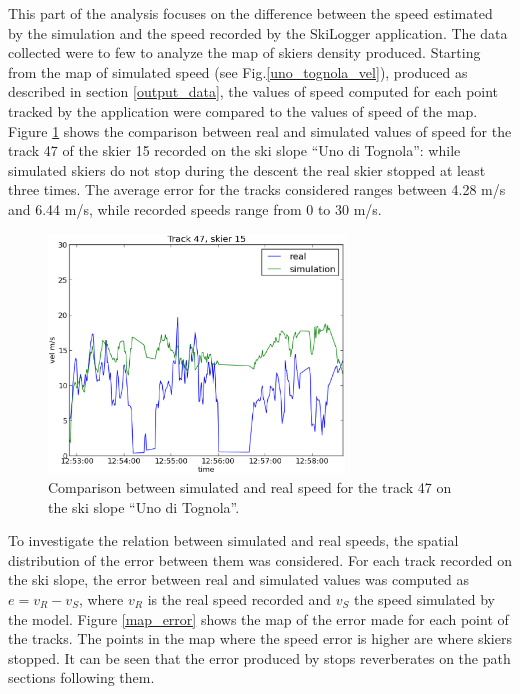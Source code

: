 \documentclass[12pt,a4paper,twoside]{book}
\begin{document}
This part of the analysis focuses on the difference between the speed estimated by the simulation and the speed recorded by the SkiLogger application. The data collected were to few to analyze the map of skiers density produced. Starting from the map of simulated speed (see Fig.\ref{uno_tognola_vel}), produced as described in section \ref{output_data}, the values of speed computed for each point tracked by the application were compared to the values of speed of the map. Figure \ref{sm_track47} shows the comparison between real and simulated values of speed for the track 47 of the skier 15 recorded on the ski slope ``Uno di Tognola'': while simulated skiers do not stop during the descent the real skier stopped at least three times. The average error for the tracks considered ranges between 4.28 m/s and 6.44 m/s, while recorded speeds range from 0 to 30 m/s.

\begin{figure}
  \begin{center}
    \includegraphics[width=0.7\textwidth]{images/sm_track47.eps}
    \caption{Comparison between simulated and real speed for the track 47 on the ski slope ``Uno di Tognola''.}\label{sm_track47}
  \end{center}
\end{figure}

To investigate the relation between simulated and real speeds, the spatial distribution of the error between them was considered. For each track recorded on the ski slope, the error between real and simulated values was computed as $e=v_R-v_S$, where $v_R$ is the real speed recorded and $v_S$ the speed simulated by the model. Figure \ref{map_error} shows the map of the error made for each point of the tracks. The points in the map where the speed error is higher are where skiers stopped. It can be seen that the error produced by stops reverberates on the path sections following them.
\end{document}
